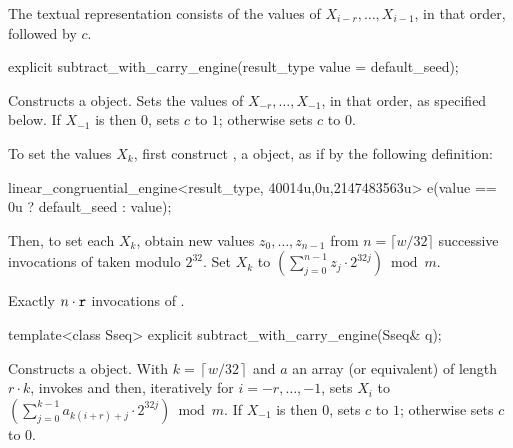 \pnum
The textual representation%
%
consists of the values of
 $X_{i-r}, \dotsc, X_{i-1}$,
in that order, followed by $c$.


%
\begin{itemdecl}
explicit subtract_with_carry_engine(result_type value = default_seed);
\end{itemdecl}

\begin{itemdescr}
\pnum\effects Constructs a  object.
 Sets the values of
 $X_{-r}, \dotsc, X_{-1}$,
 in that order, as specified below.
 If $X_{-1}$ is then $0$,
 sets $c$ to $1$;
 otherwise sets $c$ to $0$.

 To set the values $X_k$,
 first construct , a  object,
 as if by the following definition:
\begin{codeblock}
linear_congruential_engine<result_type,
                          40014u,0u,2147483563u> e(value == 0u ? default_seed : value);
\end{codeblock}
 Then, to set each $X_k$,
 obtain new values $z_0, \dotsc, z_{n-1}$
 from $n = \lceil w/32 \rceil$ successive invocations
 of  taken modulo $2^{32}$.
 Set $X_k$ to $\left( \sum_{j=0}^{n-1} z_j \cdot 2^{32j}\right) \bmod m$.

\pnum\complexity Exactly $n \cdot \texttt{r}$ invocations
 of .
\end{itemdescr}



%
\begin{itemdecl}
template<class Sseq> explicit subtract_with_carry_engine(Sseq& q);
\end{itemdecl}

\begin{itemdescr}
\pnum\effects Constructs a  object.
 With
 $k = \left\lceil w / 32 \right\rceil$
 and $a$ an array (or equivalent)
 of length $r \cdot k$,
 invokes 
 and then, iteratively for $i = -r, \dotsc, -1$,
 sets $X_i$
 to $ \left(\sum_{j=0}^{k-1}a_{k(i+r)+j} \cdot 2^{32j} \right) \bmod m $.
 If $X_{-1}$ is then $0$,
 sets $c$ to $1$;
 otherwise sets $c$ to $0$.
\end{itemdescr}


